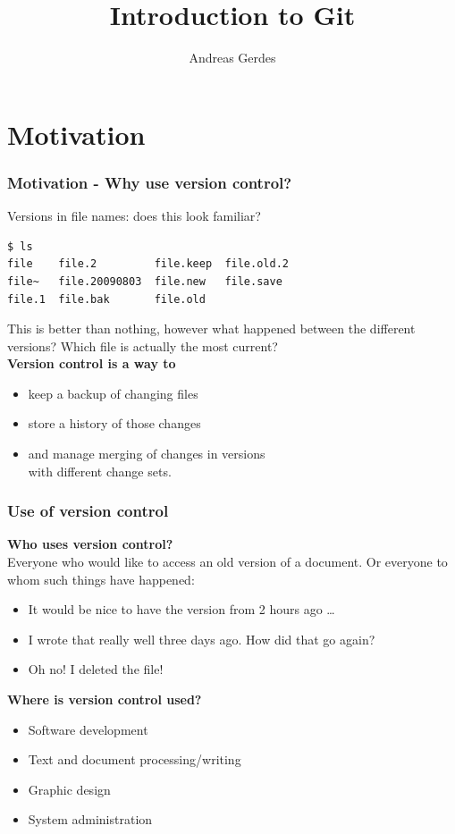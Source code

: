 \documentclass{gittalk}
\title{Introduction to Git}
\author{Andreas Gerdes}
\date{}
\begin{document}

\begin{frame}
  \titlepage
\end{frame}

\section*{Motivation}

\begin{frame}[fragile]
\frametitle{Motivation - Why use version control?}
Versions in file names: does this look familiar?
\begin{lstlisting}
$ ls
file    file.2         file.keep  file.old.2
file~   file.20090803  file.new   file.save
file.1  file.bak       file.old
\end{lstlisting}
This is better than nothing, however what happened between the different
versions?  Which file is actually the most current?\\[1em]
\textbf{Version control is a way to}
\begin{itemize}
  \item keep a backup of changing files
  \item store a history of those changes
  \item and manage merging of changes in versions\\
        with different change sets.
\end{itemize}
\end{frame}

\begin{frame}
\frametitle{Use of version control}
\textbf{Who uses version control?}\\[0.5em]
Everyone who would like to access an old version of a document.  Or everyone
to whom such things have happened:
\begin{itemize}
    \item It would be nice to have the version from 2 hours ago \ldots
    \item I wrote that really well three days ago.  How did that go
        again?
    \item Oh no!  I deleted the file!
\end{itemize}
\vspace*{1em}
\textbf{Where is version control used?}\\[0.5em]
\begin{itemize}
\item Software development
\item Text and document processing/writing
\item Graphic design
\item System administration
\end{itemize}
\end{frame}
\end{document}
